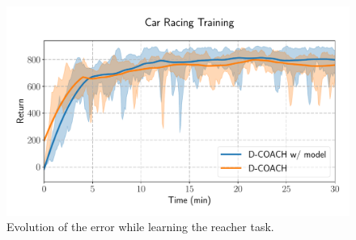 \begin{figure}[h]
    \centering
    \includegraphics[width=0.9\linewidth]{imagenes/cap3/car_racing_lstm.pdf}
    \caption{Evolution of the error while learning the reacher task. }
    \label{fig:po_cr}
\end{figure}